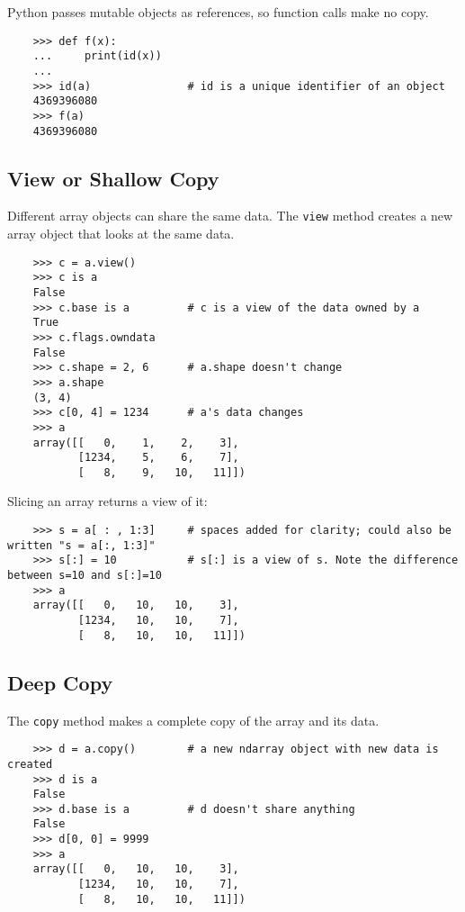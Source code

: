 \documentclass[UTF8]{article}
\begin{document}
Python passes mutable objects as references, so function calls make no copy.
\begin{verbatim}
    >>> def f(x):
    ...     print(id(x))
    ...
    >>> id(a)               # id is a unique identifier of an object
    4369396080
    >>> f(a)
    4369396080
\end{verbatim}

\subsection{View or Shallow Copy}
Different array objects can share the same data. The \texttt{view} method creates a new array
object that looks at the same data.
\begin{verbatim}
    >>> c = a.view()
    >>> c is a
    False
    >>> c.base is a         # c is a view of the data owned by a
    True
    >>> c.flags.owndata
    False
    >>> c.shape = 2, 6      # a.shape doesn't change
    >>> a.shape
    (3, 4)
    >>> c[0, 4] = 1234      # a's data changes
    >>> a
    array([[   0,    1,    2,    3],
           [1234,    5,    6,    7],
           [   8,    9,   10,   11]])
\end{verbatim}

Slicing an array returns a view of it:
\begin{verbatim}
    >>> s = a[ : , 1:3]     # spaces added for clarity; could also be written "s = a[:, 1:3]"
    >>> s[:] = 10           # s[:] is a view of s. Note the difference between s=10 and s[:]=10
    >>> a
    array([[   0,   10,   10,    3],
           [1234,   10,   10,    7],
           [   8,   10,   10,   11]])
\end{verbatim}

\subsection{Deep Copy}
The \texttt{copy} method makes a complete copy of the array and its data.
\begin{verbatim}
    >>> d = a.copy()        # a new ndarray object with new data is created
    >>> d is a
    False
    >>> d.base is a         # d doesn't share anything
    False
    >>> d[0, 0] = 9999
    >>> a
    array([[   0,   10,   10,    3],
           [1234,   10,   10,    7],
           [   8,   10,   10,   11]])
\end{verbatim}
\end{document}
